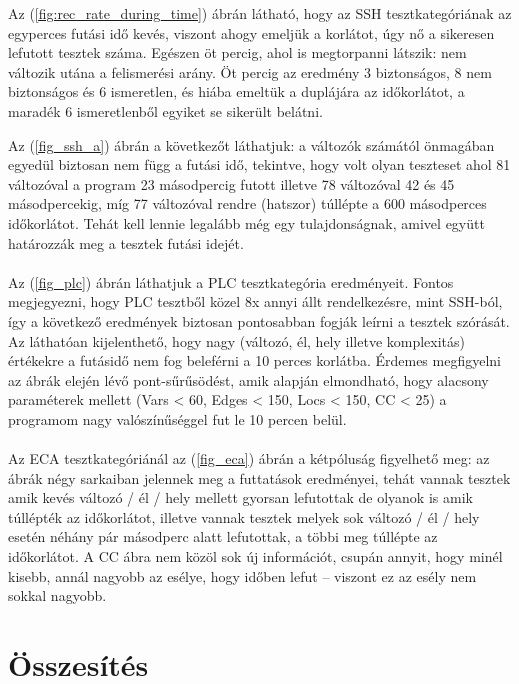Az (\ref{fig:rec_rate_during_time}) ábrán látható, hogy az SSH tesztkategóriának az egyperces futási idő kevés, viszont ahogy emeljük a korlátot, úgy nő a sikeresen lefutott tesztek száma. Egészen öt percig, ahol is megtorpanni látszik: nem változik utána a felismerési arány. Öt percig az eredmény 3 biztonságos, 8 nem biztonságos és 6 ismeretlen, és hiába emeltük a duplájára az időkorlátot, a maradék 6 ismeretlenből egyiket se sikerült belátni. 

Az (\ref{fig_ssh_a}) ábrán a következőt láthatjuk: a változók számától önmagában egyedül biztosan nem függ a futási idő, tekintve, hogy volt olyan teszteset ahol 81 változóval a program 23 másodpercig futott illetve 78 változóval 42 és 45 másodpercekig, míg 77 változóval rendre (hatszor) túllépte a 600 másodperces időkorlátot. Tehát kell lennie legalább még egy tulajdonságnak, amivel együtt határozzák meg a tesztek futási idejét.
\\
\\
Az (\ref{fig_plc}) ábrán láthatjuk a PLC tesztkategória eredményeit. Fontos megjegyezni, hogy PLC tesztből közel 8x annyi állt rendelkezésre, mint SSH-ból, így a következő eredmények biztosan pontosabban fogják leírni a tesztek szórását. Az láthatóan kijelenthető, hogy nagy (változó, él, hely illetve komplexitás) értékekre a futásidő nem fog beleférni a 10 perces korlátba. Érdemes megfigyelni az ábrák elején lévő pont-sűrűsödést, amik alapján elmondható, hogy alacsony paraméterek mellett (Vars < 60, Edges < 150, Locs < 150, CC < 25) a programom nagy valószínűséggel fut le 10 percen belül. 
\\
\\
Az ECA tesztkategóriánál az (\ref{fig_eca}) ábrán a kétpóluság figyelhető meg: az ábrák négy sarkaiban jelennek meg a futtatások eredményei, tehát vannak tesztek amik kevés változó / él / hely mellett gyorsan lefutottak de olyanok is amik túllépték az időkorlátot, illetve vannak tesztek melyek sok változó / él / hely esetén néhány pár másodperc alatt lefutottak, a többi meg túllépte az időkorlátot. A CC ábra nem közöl sok új információt, csupán annyit, hogy minél kisebb, annál nagyobb az esélye, hogy időben lefut -- viszont ez az esély nem sokkal nagyobb.

\section{Összesítés}
\label{sec:osszesites}

